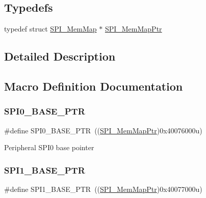 \subsection*{Typedefs}
\begin{DoxyCompactItemize}
\item 
typedef struct \hyperlink{struct_s_p_i___mem_map}{S\+P\+I\+\_\+\+Mem\+Map} $\ast$ \hyperlink{group___s_p_i___peripheral_ga7e4e9921e4d56bdbb10a04e77743ff5e}{S\+P\+I\+\_\+\+Mem\+Map\+Ptr}
\end{DoxyCompactItemize}


\subsection{Detailed Description}


\subsection{Macro Definition Documentation}
\mbox{\label{group___s_p_i___peripheral_ga851f64a97b5919c1f99a34db5918b3b4}} 
\subsubsection{\texorpdfstring{S\+P\+I0\+\_\+\+B\+A\+S\+E\+\_\+\+P\+TR}{SPI0\_BASE\_PTR}}
{\footnotesize\ttfamily \#define S\+P\+I0\+\_\+\+B\+A\+S\+E\+\_\+\+P\+TR~((\hyperlink{group___s_p_i___peripheral_ga7e4e9921e4d56bdbb10a04e77743ff5e}{S\+P\+I\+\_\+\+Mem\+Map\+Ptr})0x40076000u)}

Peripheral S\+P\+I0 base pointer \mbox{\label{group___s_p_i___peripheral_gae28fd789e0602a32076c1c13ca39f5af}} 
\subsubsection{\texorpdfstring{S\+P\+I1\+\_\+\+B\+A\+S\+E\+\_\+\+P\+TR}{SPI1\_BASE\_PTR}}
{\footnotesize\ttfamily \#define S\+P\+I1\+\_\+\+B\+A\+S\+E\+\_\+\+P\+TR~((\hyperlink{group___s_p_i___peripheral_ga7e4e9921e4d56bdbb10a04e77743ff5e}{S\+P\+I\+\_\+\+Mem\+Map\+Ptr})0x40077000u)}


